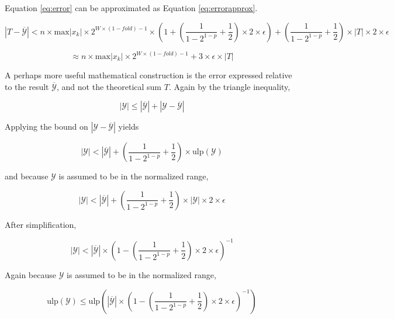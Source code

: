 \documentclass[12pt]{article}
\providecommand{\max}{\ensuremath{\text{max}}}
\providecommand{\ulp}{\ensuremath{\text{ulp}}}
\theoremstyle{plain}
\numberwithin{equation}{section}
\begin{document}
    Equation \ref{eq:error} can be approximated as Equation \ref{eq:errorapprox}.

    \begin{equation*}
      |T - \overline{\mathcal{Y}}| < n \times \max|x_k|\times 2^{W \times (1 - fold) - 1} \times(1 + (\frac{1}{1 - 2^{1 - p}} + \frac{1}{2}) \times 2 \times \epsilon) + (\frac{1}{1 - 2^{1 - p}} + \frac{1}{2})\times |T| \times 2 \times \epsilon
    \end{equation*}

    \begin{equation}
    \approx n \times \max|x_k|\times 2^{W \times (1 - fold) - 1} + 3 \times \epsilon \times |T|
      \label{eq:errorapprox}
    \end{equation}

    A perhaps more useful mathematical construction is the error expressed relative to the result $\overline{\mathcal{Y}}$, and not the theoretical sum $T$. Again by the triangle inequality,

    \begin{equation*}
      |\mathcal{Y}| \leq |\overline{\mathcal{Y}}| + |\mathcal{Y} - \overline{\mathcal{Y}}|
    \end{equation*}

    Applying the bound on $|\mathcal{Y} - \overline{\mathcal{Y}}|$ yields

    \begin{equation*}
      |\mathcal{Y}| < |\overline{\mathcal{Y}}| + (\frac{1}{1 - 2^{1 - p}} + \frac{1}{2})\times \ulp(\mathcal{Y})
    \end{equation*}

    and because $\mathcal{Y}$ is assumed to be in the normalized range,

    \begin{equation*}
      |\mathcal{Y}| < |\overline{\mathcal{Y}}| + (\frac{1}{1 - 2^{1 - p}} + \frac{1}{2})\times|\mathcal{Y}|\times 2 \times \epsilon
    \end{equation*}

    After simplification,

    \begin{equation*}
      |\mathcal{Y}| < |\overline{\mathcal{Y}}|\times (1 - (\frac{1}{1 - 2^{1 - p}} + \frac{1}{2})\times 2 \times \epsilon)^{-1}
    \end{equation*}

    Again because $\mathcal{Y}$ is assumed to be in the normalized range,

    \begin{equation*}
      \ulp(\mathcal{Y}) \leq \ulp(|\overline{\mathcal{Y}}|\times (1 - (\frac{1}{1 - 2^{1 - p}} + \frac{1}{2})\times 2 \times \epsilon)^{-1})
    \end{equation*}
\end{document}

